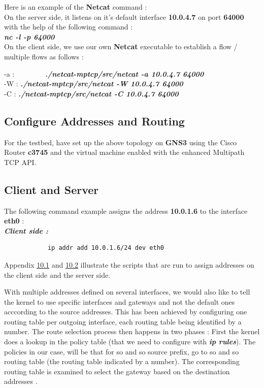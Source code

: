 \documentclass[a4paper,11pt]{article}
\begin{document}
			Here is an example of the \textbf{Netcat} command : \\
			On the server side, it listens on it's default interface \textbf{10.0.4.7} on port \textbf{64000} with the help of the following command : \\

			\textbf{\emph{nc -l -p 64000}} \\

			On the client side, we use our own \textbf{Netcat} executable to establish a flow / multiple flows as follows :

			
			\begin{tabbing}
			-a : ~~~~~~~~\=\textbf{\emph{./netcat-mptcp/src/netcat -a 10.0.4.7 64000}} \\
			-W : \> \textbf{\emph{./netcat-mptcp/src/netcat -W 10.0.4.7 64000}} \\
			-C : \> \textbf{\emph{./netcat-mptcp/src/netcat -C 10.0.4.7 64000}}
			\end{tabbing}


		\subsection{Configure Addresses and Routing}
			\label{subsec:addressandroute}
			For the testbed, have set up the above topology on \textbf{GNS3} using the Cisco Router \textbf{c3745} and the virtual machine enabled with the enhanced Multipath TCP API.

			\subsection{Client and Server}
			\label{subsec:clientandserver}
			The following command example assigns the address \textbf{10.0.1.6} to the interface \textbf{eth0} : \\
			\textbf{\emph{Client side :}} \\
			\begin{lstlisting}
			ip addr add 10.0.1.6/24 dev eth0
			\end{lstlisting}
			Appendix \hyperref[subsec:clientaddress]{10.1} and \hyperref[subsec:serveraddress]{10.2} illustrate the scripts that are run to assign addresses on the client side and the server side.

			With multiple addresses defined on several interfaces, we would also like to tell the kernel to use specific interfaces and gateways and not the default ones acccording to the source addresses. This has been achieved by configuring one routing table per outgoing interface, each routing table being identified by a number. The route selection process then happens in two phases : First the kernel does a lookup in the policy table (that we need to configure with \textbf{\emph{ip rules}}). The policies in our case, will be that for so and so source prefix, go to so and so routing table (the routing table indicated by a number). The corresponding routing table is examined to select the gateway based on the destination addresses \cite{routing}.
\end{document}
